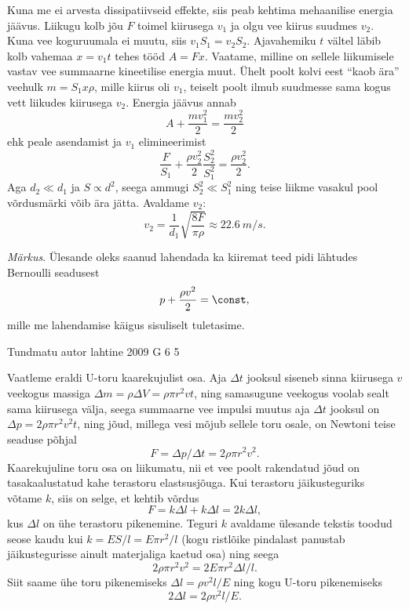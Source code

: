 \documentclass[11pt, twoside]{article}
\begin{document}
{{\ifSolution
Kuna me ei arvesta dissipatiivseid effekte, siis peab kehtima mehaanilise energia jäävus. Liikugu kolb jõu $F$ toimel kiirusega $v_1$ ja olgu vee kiirus suudmes $v_2$. Kuna vee koguruumala ei muutu, siis $v_1S_1 = v_2S_2$. Ajavahemiku $t$ vältel
läbib kolb vahemaa $x = v_1t$ tehes tööd $A = F x$. Vaatame, milline on sellele liikumisele vastav vee summaarne kineetilise energia muut. Ühelt poolt kolvi eest \enquote{kaob ära} veehulk $m = S_1x\rho$, mille kiirus oli $v_1$, teiselt poolt ilmub suudmesse sama kogus vett liikudes kiirusega $v_2$. Energia jäävus annab
\[
A+\frac{m v_{1}^{2}}{2}=\frac{m v_{2}^{2}}{2}
\]
ehk peale asendamist ja $v_1$ elimineerimist
\[
\frac{F}{S_{1}}+\frac{\rho v_{2}^{2}}{2} \frac{S_{2}^{2}}{S_{1}^{2}}=\frac{\rho v_{2}^{2}}{2}.
\]
Aga $d_2 \ll d_1$ ja $S \propto d^2$, seega ammugi $S_2^2 \ll S_1^2$ ning teise liikme vasakul pool võrdusmärki võib ära jätta. Avaldame $v_2$:
\[
v_{2}=\frac{1}{d_{1}} \sqrt{\frac{8 F}{\pi \rho}} \approx \SI{22,6}{m/s}.
\]

\emph{Märkus}. Ülesande oleks saanud lahendada ka kiiremat teed pidi lähtudes Bernoulli seadusest
\[
p+\frac{\rho v^{2}}{2}=\const,
\]
mille me lahendamise käigus sisuliselt tuletasime.
\fi
}

{Tundmatu autor} %
{lahtine} %
{2009} %
{G 6} %
{5} %
{

\ifSolution
Vaatleme eraldi U-toru kaarekujulist osa. Aja $\Delta t$ jooksul siseneb sinna kiirusega $v$ veekogus massiga $\Delta m = \rho \Delta V = \rho \pi r^2vt$, ning samasugune veekogus voolab sealt sama kiirusega välja, seega summaarne vee impulsi muutus aja $\Delta t$ jooksul on $\Delta p= 2\rho\pi r^2v^2 t$, ning jõud, millega vesi mõjub sellele toru osale, on Newtoni teise seaduse põhjal
\[
F=\Delta p/\Delta t= 2\rho\pi r^2v^2. 
\]
Kaarekujuline toru osa on liikumatu, nii et vee poolt rakendatud jõud on tasakaalustatud kahe terastoru elastsusjõuga. Kui terastoru jäikusteguriks võtame $k$, siis on selge, et kehtib võrdus
\[
F = k\Delta l+k\Delta l = 2k\Delta l,
\] 
kus $\Delta l$ on ühe terastoru pikenemine. Teguri $k$ avaldame ülesande tekstis toodud seose kaudu kui $k = ES/l = E\pi r^2/l$ (kogu ristlõike pindalast panustab jäikustegurisse ainult materjaliga kaetud osa) ning seega 
\[
2\rho\pi r^2 v^2= 2E\pi r^2\Delta l/l.
\]
Siit saame ühe toru pikenemiseks $\Delta l=\rho v^2 l/E$ ning kogu U-toru pikenemiseks 
\[
2\Delta l= 2\rho v^2 l/E.
\]
\fi
}

}
\end{document}
